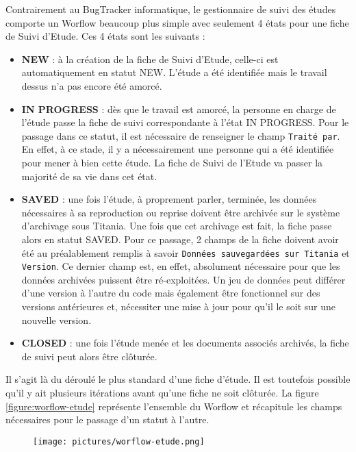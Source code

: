 Contrairement au BugTracker informatique, le gestionnaire de suivi des études comporte un Worflow beaucoup plus simple avec seulement 4 états pour une fiche de Suivi d'Etude. Ces 4 états sont les suivants :
\begin{itemize}[label=$\Rightarrow$, font=\LARGE]
   \item \textbf{NEW} : à la création de la fiche de Suivi d'Etude, celle-ci est automatiquement en statut NEW. L'étude a été identifiée mais le travail dessus n'a pas encore été amorcé.
   \item \textbf{IN PROGRESS} : dès que le travail est amorcé, la personne en charge de l'étude passe la fiche de suivi correspondante à l'état IN PROGRESS. Pour le passage dans ce statut, il est nécessaire de renseigner le champ \texttt{Traité par}. En effet, à ce stade, il y a nécessairement une personne qui a été identifiée pour mener à bien cette étude. La fiche de Suivi de l'Etude va passer la majorité de sa vie dans cet état.
   \item \textbf{SAVED} : une fois l'étude, à proprement parler, terminée, les données nécessaires à sa reproduction ou reprise doivent être archivée sur le système d'archivage sous Titania. Une fois que cet archivage est fait, la fiche passe alors en statut SAVED. Pour ce passage, 2 champs de la fiche doivent avoir été au préalablement remplis à savoir \texttt{Données sauvegardées sur Titania} et \texttt{Version}. Ce dernier champ est, en effet, absolument nécessaire pour que les données archivées puissent être ré-exploitées. Un jeu de données peut différer d'une version à l'autre du code mais également être fonctionnel sur des versions antérieures et, nécessiter une mise à jour pour qu'il le soit sur une nouvelle version.
   \item \textbf{CLOSED} : une fois l'étude menée et les documents associés archivés, la fiche de suivi peut alors être clôturée.
\end{itemize}

Il s'agit là du déroulé le plus standard d'une fiche d'étude. Il est toutefois possible qu'il y ait plusieurs itérations avant qu'une fiche ne soit clôturée. La figure \ref{figure:worflow-etude} représente l'ensemble du Worflow et récapitule les champs nécessaires pour le passage d'un statut à l'autre.\\
\vspace{0.1cm}
\begin{figure}[H]
   \centering
   \texttt{[image: pictures/worflow-etude.png]}                        
   \vspace*{0.2cm}
\end{figure}
